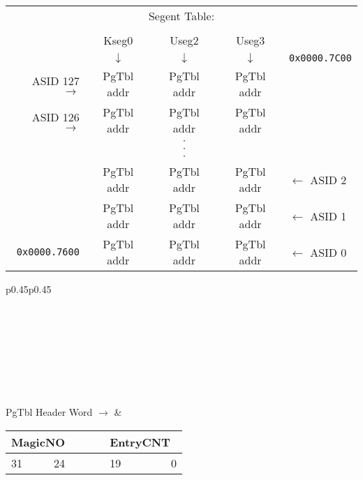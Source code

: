 {
\centering
\begin{tabular}{r|c|c|c|l}
\multicolumn{5}{c}{Segent Table:} \\
\multicolumn{5}{c}{}\\
\multicolumn{1}{c}{} & \multicolumn{1}{c}{Kseg0} & \multicolumn{1}{c}{Useg2} & \multicolumn{1}{c}{Useg3} & \multicolumn{1}{c}{} \\
\multicolumn{1}{c}{} & \multicolumn{1}{c}{$\downarrow$} & \multicolumn{1}{c}{$\downarrow$} & \multicolumn{1}{c}{$\downarrow$} & \multicolumn{1}{c}{\texttt{0x0000.7C00}} \\
\cline{2-4}
ASID 127 $\rightarrow$ & PgTbl addr & PgTbl addr & PgTbl addr & \\
\cline{2-4}
ASID 126 $\rightarrow$ & PgTbl addr & PgTbl addr & PgTbl addr & \\
\cline{2-4}
\multicolumn{1}{c}{} & \multicolumn{1}{c}{} & \multicolumn{1}{c}{$\cdot$} & \multicolumn{1}{c}{} & \multicolumn{1}{c}{} \\
\multicolumn{1}{c}{} & \multicolumn{1}{c}{} & \multicolumn{1}{c}{$\cdot$} & \multicolumn{1}{c}{} & \multicolumn{1}{c}{} \\
\multicolumn{1}{c}{} & \multicolumn{1}{c}{} & \multicolumn{1}{c}{$\cdot$} & \multicolumn{1}{c}{} & \multicolumn{1}{c}{} \\
\cline{2-4}
& PgTbl addr & PgTbl addr & PgTbl addr & $\leftarrow$ ASID 2 \\
\cline{2-4}
& PgTbl addr & PgTbl addr & PgTbl addr & $\leftarrow$ ASID 1 \\
\cline{2-4}
\texttt{0x0000.7600} & PgTbl addr & PgTbl addr & PgTbl addr & $\leftarrow$ ASID 0 \\
\cline{2-4}
\end{tabular}

\centering
\begin{tabular}{p{}p{}}
 \\
\\
\hline
{}\\
\hline
{}\\
\\
\\
\hline
{}\\
\hline
{}\\
\hline
{}\\
\hline
\hfill PgTbl Header Word $\rightarrow$ & 
	\begin{tabular}{lrclr}
	\multicolumn{2}{|c|}{MagicNO} & \cellcolor{gray}& \multicolumn{2}{|c|}{\hspace{14px}EntryCNT\hspace{11px}\ } \\
	\hline
	\footnotesize{31} & \footnotesize{24} & \ \ \ \ & \footnotesize{19} & \footnotesize{0} \\
	\end{tabular}
\end{tabular}
}